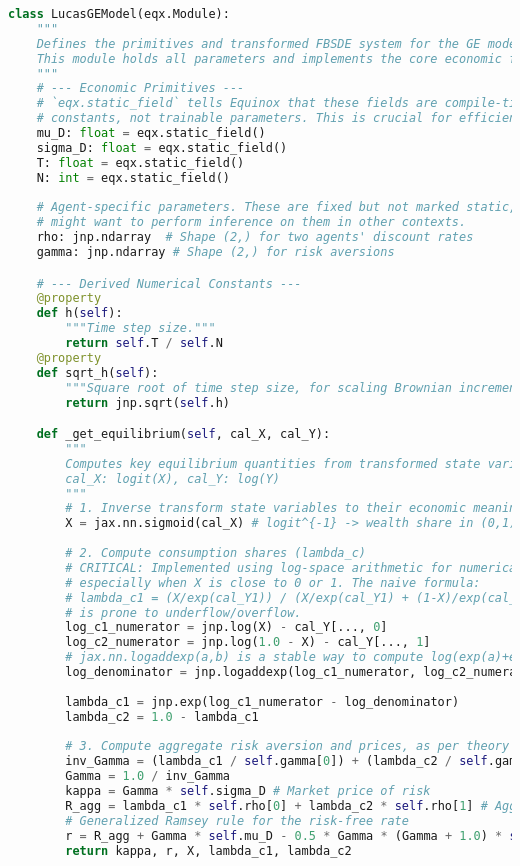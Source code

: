 \begin{lstlisting}[language=Python, caption={C.2: Transformed Lucas Model FBSDE Coefficients in JAX.}, label={lst:lucas_jax_transformed_app_appendix}]
class LucasGEModel(eqx.Module):
    """
    Defines the primitives and transformed FBSDE system for the GE model.
    This module holds all parameters and implements the core economic functions.
    """
    # --- Economic Primitives ---
    # `eqx.static_field` tells Equinox that these fields are compile-time 
    # constants, not trainable parameters. This is crucial for efficient JIT compilation.
    mu_D: float = eqx.static_field()
    sigma_D: float = eqx.static_field()
    T: float = eqx.static_field()
    N: int = eqx.static_field()
    
    # Agent-specific parameters. These are fixed but not marked static, as one
    # might want to perform inference on them in other contexts.
    rho: jnp.ndarray  # Shape (2,) for two agents' discount rates
    gamma: jnp.ndarray # Shape (2,) for risk aversions

    # --- Derived Numerical Constants ---
    @property
    def h(self): 
        """Time step size."""
        return self.T / self.N
    @property
    def sqrt_h(self): 
        """Square root of time step size, for scaling Brownian increments."""
        return jnp.sqrt(self.h)

    def _get_equilibrium(self, cal_X, cal_Y):
        """
        Computes key equilibrium quantities from transformed state variables.
        cal_X: logit(X), cal_Y: log(Y)
        """
        # 1. Inverse transform state variables to their economic meaning
        X = jax.nn.sigmoid(cal_X) # logit^{-1} -> wealth share in (0,1)
        
        # 2. Compute consumption shares (lambda_c)
        # CRITICAL: Implemented using log-space arithmetic for numerical stability,
        # especially when X is close to 0 or 1. The naive formula:
        # lambda_c1 = (X/exp(cal_Y1)) / (X/exp(cal_Y1) + (1-X)/exp(cal_Y2))
        # is prone to underflow/overflow.
        log_c1_numerator = jnp.log(X) - cal_Y[..., 0]
        log_c2_numerator = jnp.log(1.0 - X) - cal_Y[..., 1]
        # jax.nn.logaddexp(a,b) is a stable way to compute log(exp(a)+exp(b))
        log_denominator = jnp.logaddexp(log_c1_numerator, log_c2_numerator)
        
        lambda_c1 = jnp.exp(log_c1_numerator - log_denominator)
        lambda_c2 = 1.0 - lambda_c1
        
        # 3. Compute aggregate risk aversion and prices, as per theory
        inv_Gamma = (lambda_c1 / self.gamma[0]) + (lambda_c2 / self.gamma[1])
        Gamma = 1.0 / inv_Gamma
        kappa = Gamma * self.sigma_D # Market price of risk
        R_agg = lambda_c1 * self.rho[0] + lambda_c2 * self.rho[1] # Agg. discount rate
        # Generalized Ramsey rule for the risk-free rate
        r = R_agg + Gamma * self.mu_D - 0.5 * Gamma * (Gamma + 1.0) * self.sigma_D**2
        return kappa, r, X, lambda_c1, lambda_c2


\end{lstlisting}
